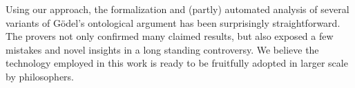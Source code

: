 \documentclass{birkjour}
\theoremstyle{definition}
\theoremstyle{remark}
\numberwithin{equation}{section}
\begin{document}
Using our approach, the formalization and (partly) automated analysis
of several variants of G\"odel's ontological argument has been
surprisingly straightforward. The provers not only confirmed many
claimed results, but also exposed a few mistakes and novel insights
in a long standing controversy.
We believe the technology employed in
this work is ready to be fruitfully adopted in larger scale by
philosophers.







\sloppy
\printbibliography



\end{document}
